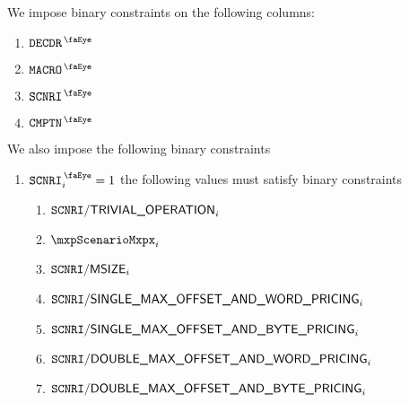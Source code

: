 We impose binary constraints on the following columns:
\begin{multicols}{4}
	\begin{enumerate}
		\item $\isMxpInstructionDecoder$
		\item $\isMxpMacro             $
		\item $\isMxpScenario          $
		\item $\isMxpComputation       $
	\end{enumerate}
\end{multicols}

We also impose the following binary constraints
\begin{enumerate}
	\item \If $\isMxpScenario _{i} = 1$ \Then the following values must satisfy binary constraints
		\begin{enumerate}
			\item $\texttt{SCNRI}\textsf{/}{\textsf{TRIVIAL\_OPERATION}}              _{i}$
			\item $\mxpScenarioMxpx                          _{i}$
			\item $\texttt{SCNRI}\textsf{/}{\textsf{MSIZE}}                         _{i}$
			\item $\texttt{SCNRI}\textsf{/}{\textsf{SINGLE\_MAX\_OFFSET\_AND\_WORD\_PRICING}} _{i}$
			\item $\texttt{SCNRI}\textsf{/}{\textsf{SINGLE\_MAX\_OFFSET\_AND\_BYTE\_PRICING}} _{i}$
			\item $\texttt{SCNRI}\textsf{/}{\textsf{DOUBLE\_MAX\_OFFSET\_AND\_WORD\_PRICING}} _{i}$
			\item $\texttt{SCNRI}\textsf{/}{\textsf{DOUBLE\_MAX\_OFFSET\_AND\_BYTE\_PRICING}} _{i}$
		\end{enumerate}
\end{enumerate}

